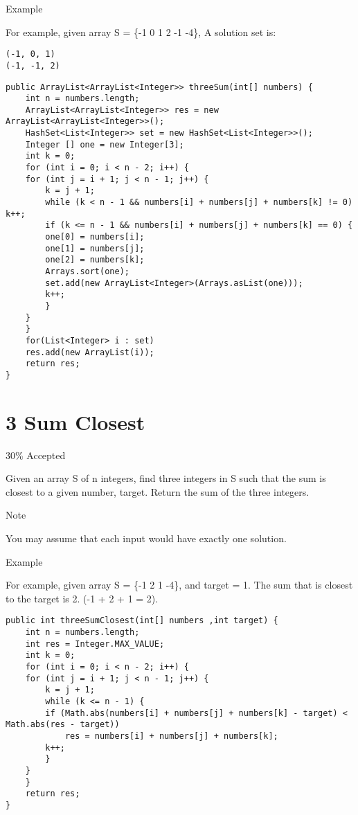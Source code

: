 \documentclass[12pt]{book}
\begin{document}
Example

For example, given array S = \{-1 0 1 2 -1 -4\}, A solution set is:
\lstset{language=java,label= ,caption= ,numbers=none}
\begin{lstlisting}
(-1, 0, 1)
(-1, -1, 2)
\end{lstlisting}
\lstset{language=java,label= ,caption= ,numbers=none}
\begin{lstlisting}
public ArrayList<ArrayList<Integer>> threeSum(int[] numbers) {
    int n = numbers.length;
    ArrayList<ArrayList<Integer>> res = new ArrayList<ArrayList<Integer>>();
    HashSet<List<Integer>> set = new HashSet<List<Integer>>();
    Integer [] one = new Integer[3];
    int k = 0;
    for (int i = 0; i < n - 2; i++) {
	for (int j = i + 1; j < n - 1; j++) {
	    k = j + 1;
	    while (k < n - 1 && numbers[i] + numbers[j] + numbers[k] != 0) k++;
	    if (k <= n - 1 && numbers[i] + numbers[j] + numbers[k] == 0) {
		one[0] = numbers[i];
		one[1] = numbers[j];
		one[2] = numbers[k];
		Arrays.sort(one);
		set.add(new ArrayList<Integer>(Arrays.asList(one)));
		k++;
	    }
	}
    }
    for(List<Integer> i : set) 
	res.add(new ArrayList(i));
    return res;
}
\end{lstlisting}
\chapter{3 Sum Closest}
\label{sec-4}

30\% Accepted

Given an array S of n integers, find three integers in S such that the sum is closest to a given number, target. Return the sum of the three integers. 

Note

You may assume that each input would have exactly one solution.

Example

For example, given array S = \{-1 2 1 -4\}, and target = 1. The sum that is closest to the target is 2. (-1 + 2 + 1 = 2).

\lstset{language=java,label= ,caption= ,numbers=none}
\begin{lstlisting}
public int threeSumClosest(int[] numbers ,int target) {
    int n = numbers.length;
    int res = Integer.MAX_VALUE;
    int k = 0;
    for (int i = 0; i < n - 2; i++) {
	for (int j = i + 1; j < n - 1; j++) {
	    k = j + 1;
	    while (k <= n - 1) {
		if (Math.abs(numbers[i] + numbers[j] + numbers[k] - target) < Math.abs(res - target))
		    res = numbers[i] + numbers[j] + numbers[k];
		k++;
	    }
	}
    }
    return res;
}
\end{lstlisting}
\end{document}
